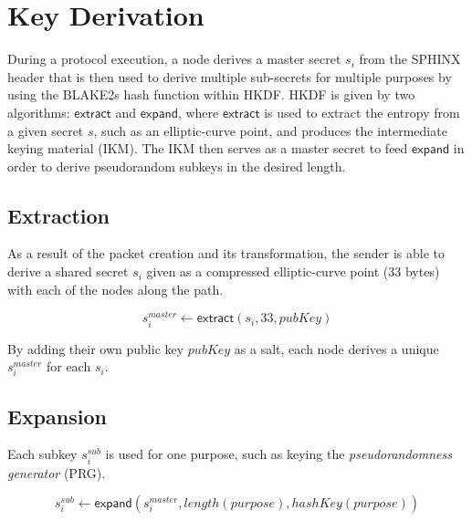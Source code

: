 \section{Key Derivation}
\label{appendix:keyderivation}

During a protocol execution, a node derives a master secret $s_i$ from the SPHINX header that is then used to derive multiple sub-secrets for multiple purposes by using the BLAKE2s hash function within HKDF. HKDF is given by two algorithms: $\mathsf{extract}$ and $\mathsf{expand}$, where $\mathsf{extract}$ is used to extract the entropy from a given secret $s$, such as an elliptic-curve point, and produces the intermediate keying material (IKM). The IKM then serves as a master secret to feed $\mathsf{expand}$ in order to derive pseudorandom subkeys in the desired length.

\subsection{Extraction}

As a result of the packet creation and its transformation, the sender is able to derive a shared secret $s_i$ given as a compressed elliptic-curve point (33 bytes) with each of the nodes along the path.

$$s_i^{master} \longleftarrow \mathsf{extract}(s_i, 33, pubKey)$$

By adding their own public key $pubKey$ as a salt, each node derives a unique $s_i^{master}$ for each $s_i$.

\subsection{Expansion}

Each subkey $s_i^{sub}$ is used for one purpose, such as keying the \textit{pseudorandomness generator} (PRG).

$$s_i^{sub} \longleftarrow \mathsf{expand}(s_i^{master}, length(purpose), hashKey(purpose))$$

